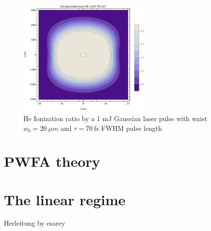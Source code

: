 \begin{figure}
\centering
\includegraphics[width=0.6\textwidth]{theory/images/raw/Ionization_Torch_contourplot.pdf}
\caption{He Ionization ratio by a 1 mJ Gaussian laser pulse with waist $w_0=20\ \mu m$ and $\tau = 70\ \mathrm{fs}$ FWHM pulse length}
\label{img:Torch_contourplot}

\end{figure}



\section{PWFA theory}
\section{The linear regime}
Herleitung by esarey \cite{RevModPhys.81.1229}


